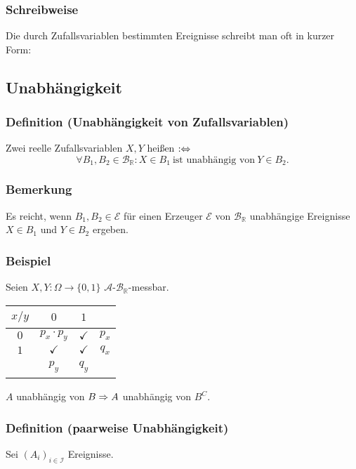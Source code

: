 \subsubsection{Schreibweise}
Die durch Zufallsvariablen bestimmten Ereignisse schreibt man oft in kurzer Form:
\subsection{Unabh\"angigkeit}
\subsubsection{Definition (Unabh\"angigkeit von Zufallsvariablen)}
Zwei reelle Zufallsvariablen $X,Y$ hei\ss{}en  $:\Leftrightarrow$
\[\forall B_1,B_2\in\mathcal{B}_\mathbb{R}\colon X\in B_1\ \text{ist unabh\"angig von}\ Y\in B_2.\]
\subsubsection{Bemerkung}
Es reicht, wenn $B_1,B_2\in\mathcal{E}$ f\"ur einen Erzeuger $\mathcal{E}$ von $\mathcal{B}_\mathbb{R}$ unabh\"angige Ereignisse $X\in B_1$ und $Y\in B_2$ ergeben.
\subsubsection{Beispiel}
Seien $X,Y\colon\Omega\to\{0,1\}$ $\mathcal{A}$-$\mathcal{B}_\mathbb{R}$-messbar.
\begin{center}
\begin{tabular}{c|c|c|c}
$x/y$&$0$&$1$&~\\
\hline
$0$&$p_x\cdot p_y$&$\checkmark$&$p_x$\\
\hline
$1$&$\checkmark$&$\checkmark$&$q_x$\\
\hline
~&$p_y$&$q_y$&~
\end{tabular}
\end{center}
$A$ unabh\"angig von $B\Rightarrow A$ unabh\"angig von $B^C$.
\subsubsection{Definition (paarweise Unabh\"angigkeit)}
Sei $(A_i)_{i\in\mathcal{I}}$ Ereignisse.

